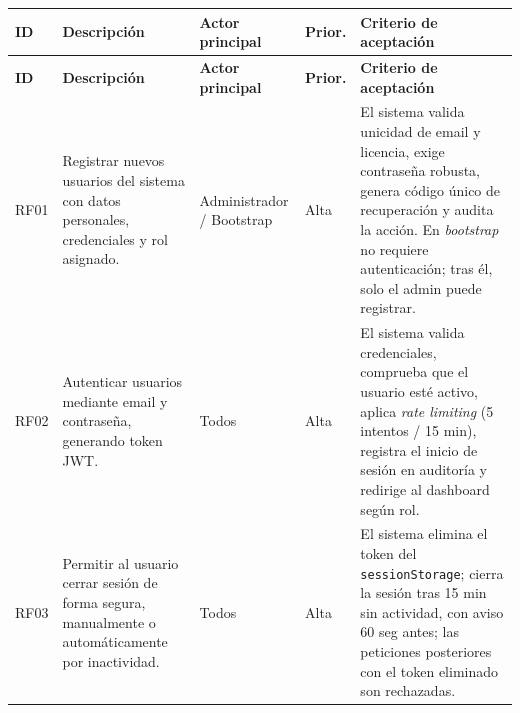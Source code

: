\documentclass[11pt,a4paper]{article}
\begin{document}
\begin{longtable}{|C{1cm}|L{5cm}|L{2.5cm}|C{1cm}|L{4cm}|}
    \hline
    \textbf{ID} & \textbf{Descripción}                                                                                                   & \textbf{Actor principal}       & \textbf{Prior.} & \textbf{Criterio de aceptación}                                                                                                                                                                                            \\
    \hline
    \endfirsthead

    \hline
    \textbf{ID} & \textbf{Descripción}                                                                                                   & \textbf{Actor principal}       & \textbf{Prior.} & \textbf{Criterio de aceptación}                                                                                                                                                                                            \\
    \hline
    \endhead

    RF01        & Registrar nuevos usuarios del sistema con datos personales, credenciales y rol asignado.                               & Administrador / Bootstrap      & Alta            & El sistema valida unicidad de email y licencia, exige contraseña robusta, genera código único de recuperación y audita la acción. En \textit{bootstrap} no requiere autenticación; tras él, solo el admin puede registrar. \\
    \hline

    RF02        & Autenticar usuarios mediante email y contraseña, generando token JWT.                                                  & Todos                          & Alta            & El sistema valida credenciales, comprueba que el usuario esté activo, aplica \textit{rate limiting} (5 intentos / 15 min), registra el inicio de sesión en auditoría y redirige al dashboard según rol.                    \\
    \hline

    RF03        & Permitir al usuario cerrar sesión de forma segura, manualmente o automáticamente por inactividad.                      & Todos                          & Alta            & El sistema elimina el token del \texttt{sessionStorage}; cierra la sesión tras 15 min sin actividad, con aviso 60 seg antes; las peticiones posteriores con el token eliminado son rechazadas.                             \\
    \hline


\end{longtable}
\end{document}
